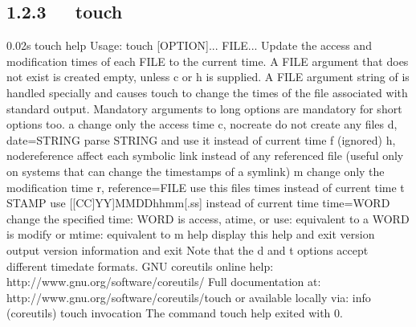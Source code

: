 \documentclass[letterpaper,12pt,english]{sphinxmanual}
\begin{document}
\subsection{1.2.3   touch}
\label{\detokenize{001software/001install/linux:touch}}
\begin{sphinxVerbatim}[commandchars=\\\{\}]
0.02s\PYGZdl{} touch \PYGZhy{}\PYGZhy{}help
Usage: touch [OPTION]... FILE...
Update the access and modification times of each FILE to the current time.
A FILE argument that does not exist is created empty, unless \PYGZhy{}c or \PYGZhy{}h
is supplied.
A FILE argument string of \PYGZhy{} is handled specially and causes touch to
change the times of the file associated with standard output.
Mandatory arguments to long options are mandatory for short options too.
  \PYGZhy{}a                     change only the access time
  \PYGZhy{}c, \PYGZhy{}\PYGZhy{}no\PYGZhy{}create        do not create any files
  \PYGZhy{}d, \PYGZhy{}\PYGZhy{}date=STRING      parse STRING and use it instead of current time
  \PYGZhy{}f                     (ignored)
  \PYGZhy{}h, \PYGZhy{}\PYGZhy{}no\PYGZhy{}dereference   affect each symbolic link instead of any   referenced
                         file (useful only on systems that can change the
                         timestamps of a symlink)
  \PYGZhy{}m                     change only the modification time
  \PYGZhy{}r, \PYGZhy{}\PYGZhy{}reference=FILE   use this file\PYGZsq{}s times instead of current time
  \PYGZhy{}t STAMP               use [[CC]YY]MMDDhhmm[.ss] instead of current time
      \PYGZhy{}\PYGZhy{}time=WORD        change the specified time:
                           WORD is access, atime, or use: equivalent to \PYGZhy{}a
                           WORD is modify or mtime: equivalent to \PYGZhy{}m
      \PYGZhy{}\PYGZhy{}help     display this help and exit
      \PYGZhy{}\PYGZhy{}version  output version information and exit
Note that the \PYGZhy{}d and \PYGZhy{}t options accept different time\PYGZhy{}date formats.
GNU coreutils online help: \PYGZlt{}http://www.gnu.org/software/coreutils/\PYGZgt{}
Full documentation at: \PYGZlt{}http://www.gnu.org/software/coreutils/touch\PYGZgt{}
or available locally via: info \PYGZsq{}(coreutils) touch invocation\PYGZsq{}
The command \PYGZdq{}touch \PYGZhy{}\PYGZhy{}help\PYGZdq{} exited with 0.
\end{sphinxVerbatim}
\end{document}

